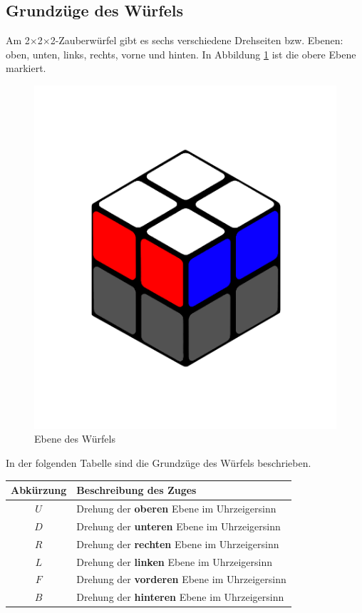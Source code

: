 \documentclass[12pt,a4paper, usenames, dvipsnames]{article}
\theoremstyle{mystyle}
\theoremstyle{definition}
\newcommand{\Ttwo}{2$\times$2$\times$2-}
\begin{document}
\subsection{Grundzüge des Würfels} 

\label{Abschnitt_GrundzügeWürfel}
Am \Ttwo Zauberwürfel gibt es sechs verschiedene Drehseiten bzw. Ebenen: oben, unten, links, rechts, vorne und hinten. 
In Abbildung \ref{Abbildung_Ebene} ist die obere Ebene markiert.

\begin{figure}[H]
\centering
\includegraphics[scale=0.1]{ebene.png}
\caption[Ebene des Würfels]{Ebene des Würfels}
\label{Abbildung_Ebene}
\end{figure}

In der folgenden Tabelle sind die Grundzüge des Würfels beschrieben.

\begin{center}
\begin{tabular}{cl}
\toprule
\textbf{Abkürzung} & \textbf{Beschreibung des Zuges} \\
\midrule
$U$ & Drehung der \textbf{oberen} Ebene im Uhrzeigersinn \\
$D$ & Drehung der \textbf{unteren} Ebene im Uhrzeigersinn \\
$R$ & Drehung der \textbf{rechten} Ebene im Uhrzeigersinn \\
$L$ & Drehung der \textbf{linken} Ebene im Uhrzeigersinn \\
$F$ & Drehung der \textbf{vorderen} Ebene im Uhrzeigersinn \\
$B$ & Drehung der \textbf{hinteren} Ebene im Uhrzeigersinn \\
\bottomrule
\end{tabular} 
\end{center}
\end{document}
